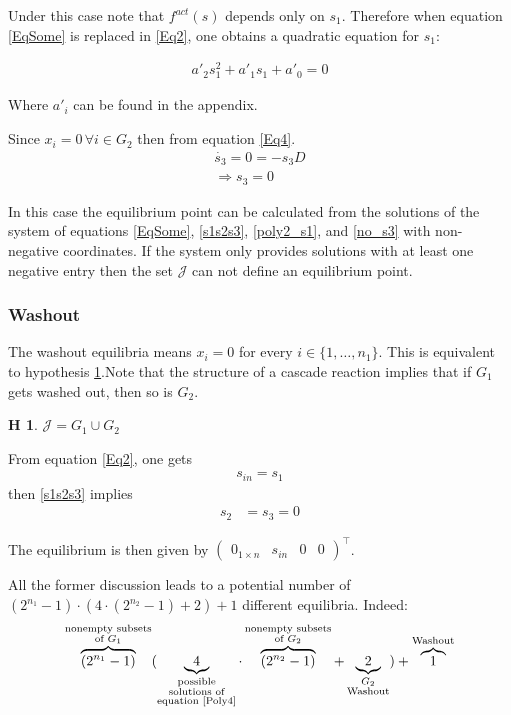 \documentclass[3p,times]{article}
\newtheorem{hypo}{H}
\begin{document}
Under this case note that $f^{act}(s)$ depends only on $s_1$. Therefore when equation \eqref{EqSome} is replaced in \eqref{Eq2}, one obtains a quadratic equation for $s_1$:

\begin{align}
\label{poly2_s1} a'_2 s_1^2 + a'_1s_1 + a'_0 = 0
\end{align}

Where $a'_i$ can be found in the appendix.

Since $x_i = 0 \, \forall i \in G_2$ then from equation \eqref{Eq4}.
\begin{align}
\dot{s_3} = 0 = -s_3D \\
\Rightarrow s_3 = 0 \label{no_s3}
\end{align}

In this case the equilibrium point can be calculated from the solutions of the system of equations \eqref{EqSome}, \eqref{s1s2s3}, \eqref{poly2_s1}, and \eqref{no_s3} with non-negative coordinates. If the system only provides solutions with at least one negative entry then the set $\mathcal{J}$ can not define an equilibrium point.

\subsubsection{Washout}
	
The washout equilibria means $x_i = 0$ for every $i \in \{1,\dots, n_1\}$. This is equivalent to hypothesis \ref{hypothesis washout}.Note that the structure of a cascade reaction implies that if $G_1$ gets washed out, then so is $G_2$.

\begin{hypo} 
	$\mathcal{J} = G_1 \cup G_2$
	\label{hypothesis washout}
\end{hypo} 

From equation \eqref{Eq2}, one gets 
\begin{align*} s_{in} = s_1 \end{align*}
then \eqref{s1s2s3} implies 
\begin{align*}s_2 &= s_3 = 0 \end{align*}   

The equilibrium is then given by $\begin{pmatrix} 0_{1\times n}& s_{in}&0 &0 \end{pmatrix}^\top$.

All the former discussion leads to a potential number of   $ (2^{n_1}-1)\cdot (4\cdot(2^{n_2}-1)+2)+1 $  different equilibria. Indeed: 
\begin{align} \overbrace{(2^{n_1}-1)}^{\substack{\text{nonempty subsets} \\ \text{of }G_1 }} (\underbrace{4}_{\substack{\text{possible} \\ \text{solutions of} \\ \text{equation \eqref{Poly4}}}} \cdot\overbrace{(2^{n_2}-1)}^{\substack{\text{nonempty subsets} \\ \text{of  }G_2}}+\underbrace{2}_{\substack{G_2 \\ \text{Washout}}})+\overbrace{1}^\text{Washout} 
\end{align}
\end{document}
